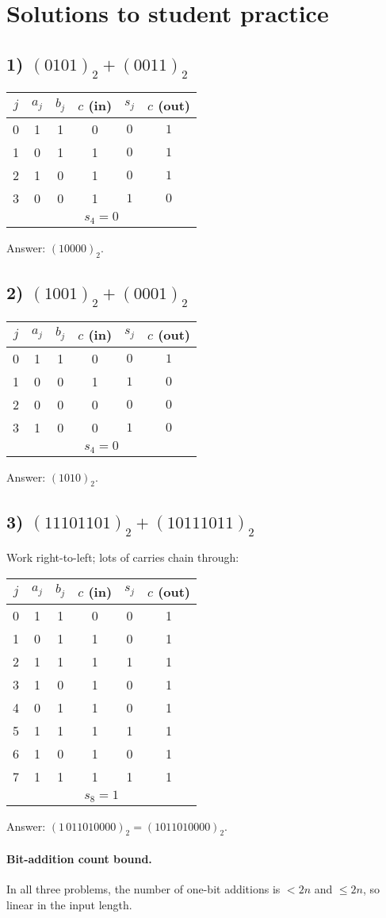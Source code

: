 \documentclass[12pt]{article}
\begin{document}
\section*{Solutions to student practice}

\subsection*{1) $(0101)_2 + (0011)_2$}
\begin{center}
\begin{tabular}{c|c c c|c c}
$j$ & $a_j$ & $b_j$ & $c$ (in) & $s_j$ & $c$ (out)\\\hline
0 & 1 & 1 & 0 & $0$ & $1$\\
1 & 0 & 1 & 1 & $0$ & $1$\\
2 & 1 & 0 & 1 & $0$ & $1$\\
3 & 0 & 0 & 1 & $1$ & $0$\\\hline
\multicolumn{6}{c}{$s_4=0$}
\end{tabular}
\end{center}
Answer: $(10000)_2$.

\subsection*{2) $(1001)_2 + (0001)_2$}
\begin{center}
\begin{tabular}{c|c c c|c c}
$j$ & $a_j$ & $b_j$ & $c$ (in) & $s_j$ & $c$ (out)\\\hline
0 & 1 & 1 & 0 & $0$ & $1$\\
1 & 0 & 0 & 1 & $1$ & $0$\\
2 & 0 & 0 & 0 & $0$ & $0$\\
3 & 1 & 0 & 0 & $1$ & $0$\\\hline
\multicolumn{6}{c}{$s_4=0$}
\end{tabular}
\end{center}
Answer: $(1010)_2$.

\subsection*{3) $(11101101)_2 + (10111011)_2$}
Work right-to-left; lots of carries chain through:
\begin{center}
\begin{tabular}{c|c c c|c c}
$j$ & $a_j$ & $b_j$ & $c$ (in) & $s_j$ & $c$ (out)\\\hline
0 & 1 & 1 & 0 & 0 & 1\\
1 & 0 & 1 & 1 & 0 & 1\\
2 & 1 & 1 & 1 & 1 & 1\\
3 & 1 & 0 & 1 & 0 & 1\\
4 & 0 & 1 & 1 & 0 & 1\\
5 & 1 & 1 & 1 & 1 & 1\\
6 & 1 & 0 & 1 & 0 & 1\\
7 & 1 & 1 & 1 & 1 & 1\\\hline
\multicolumn{6}{c}{$s_8=1$}
\end{tabular}
\end{center}
Answer: $(1\,011010000)_2=(1011010000)_2$.

\paragraph{Bit-addition count bound.} In all three problems, the number of one-bit additions is $<2n$ and $\le 2n$, so linear in the input length.
\end{document}
